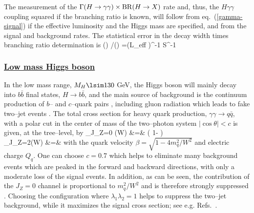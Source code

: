 The measurement of the $\Gamma(H \to\gamma\gamma) \times {\rm BR}(H \to X)$ 
rate and, thus, the $H\gamma \gamma$ coupling squared if the branching ratio 
is known, will follow from eq.~(\ref{gamma-signal}) if the effective luminosity
and the Higgs mass are specified, and from the signal and background rates. 
The statistical error in the decay width times branching ratio determination is
\beq
\Delta (\Gamma {}) /(\Gamma {}) =({\cal L}_{\rm eff}
)^{-1} S^{-1}
\eeq

\subsubsection*{\underline{Low mass Higgs boson}}

In the low mass range,  $M_H \lsim 130$ GeV, the Higgs boson will mainly decay
into $b\bar{b}$ final states, $H \to b\bar{b}$, and the main source of
background is the continuum production of $b$-- and $c$--quark pairs
\cite{gam-ff}, including gluon radiation which leads to fake two--jet  events
\cite{gam-ff-NLO1}. The total cross section for heavy quark production, $\gamma
\gamma \to q\bar{q}$, with a polar cut in the center of mass of the 
two--photon system $|\cos \theta| <c$ is given, at the tree--level, by
\beq
\hat \sigma_{J_Z=0} (W) &=& 
\left( 1-  \right)  \non \\
\hat\sigma_{J_Z=2}(W) &=& 
\label{ggqq:bckg}
\eeq
with the quark velocity $\beta=\sqrt{1-4m^2_q/W^2}$ and electric charge $Q_q$.
One can choose $c=0.7$ which helps to eliminate many background events which
are peaked in the forward and backward directions, with only a moderate loss of
the signal events. In addition, as can be seen, the contribution of the $J_Z=0$
channel is proportional to $m_q^2/W^2$ and is therefore strongly suppressed
\cite{gam-ff}. Choosing the configuration where $\lambda_1 \lambda_2=1$ helps 
to suppress the two--jet background, while it maximizes the signal cross 
section; see e.g. Refs.~\cite{gamma-machine2,gam-Kuhn}.  \s

